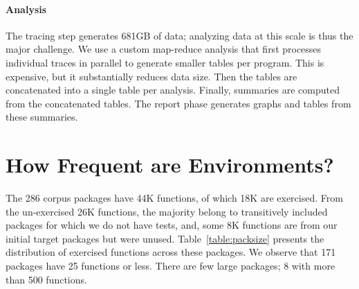 \documentclass[10pt,sigplan,authorversion=true]{acmart}
\newcommand{\envtracer}{{\sf envtracer}\xspace}
\newcommand{\rdyntrace}{{\sf R-dyntrace}\xspace}
\begin{document}
\paragraph{Analysis} The tracing step generates 681GB of data; analyzing data at
this scale is thus the major challenge. We use a custom map-reduce analysis that
first processes individual traces in parallel to generate smaller tables per
program. This is expensive, but it substantially reduces data size. Then the
tables are concatenated into a single table per analysis. Finally, summaries are
computed from the concatenated tables. The report phase generates graphs and
tables from these summaries.



\section{How Frequent are Environments?}

The 286 corpus packages have 44K functions, of which 18K are exercised. From the
un-exercised 26K functions, the majority belong to transitively included
packages for which we do not have tests, and, some 8K functions are from our
initial target packages but were unused. Table~\ref{table:packsize} presents the
distribution of exercised functions across these packages. We observe that 171
packages have 25 functions or less. There are few large packages; 8 with more
than 500 functions.
\end{document}
